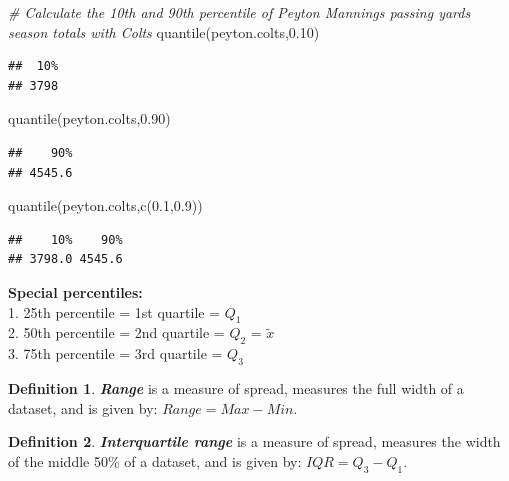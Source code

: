 \documentclass[
]{book}
\newenvironment{Shaded}{\begin{snugshade}}{\end{snugshade}}
\newcommand{\CommentTok}[1]{\textcolor[rgb]{0.56,0.35,0.01}{\textit{#1}}}
\newcommand{\FloatTok}[1]{\textcolor[rgb]{0.00,0.00,0.81}{#1}}
\newcommand{\FunctionTok}[1]{\textcolor[rgb]{0.00,0.00,0.00}{#1}}
\newcommand{\NormalTok}[1]{#1}
\theoremstyle{definition}
\newtheorem{definition}{Definition}[chapter]
\theoremstyle{definition}
\theoremstyle{definition}
\theoremstyle{definition}
\theoremstyle{remark}
\begin{document}
\begin{Shaded}
\begin{Highlighting}[]
\CommentTok{\# Calculate the 10th and 90th percentile of Peyton Manning\textquotesingle{}s passing yards season totals with Colts}
\FunctionTok{quantile}\NormalTok{(peyton.colts,}\FloatTok{0.10}\NormalTok{)}
\end{Highlighting}
\end{Shaded}

\begin{verbatim}
##  10% 
## 3798
\end{verbatim}

\begin{Shaded}
\begin{Highlighting}[]
\FunctionTok{quantile}\NormalTok{(peyton.colts,}\FloatTok{0.90}\NormalTok{)}
\end{Highlighting}
\end{Shaded}

\begin{verbatim}
##    90% 
## 4545.6
\end{verbatim}

\begin{Shaded}
\begin{Highlighting}[]
\FunctionTok{quantile}\NormalTok{(peyton.colts,}\FunctionTok{c}\NormalTok{(}\FloatTok{0.1}\NormalTok{,}\FloatTok{0.9}\NormalTok{))}
\end{Highlighting}
\end{Shaded}

\begin{verbatim}
##    10%    90% 
## 3798.0 4545.6
\end{verbatim}

\textbf{Special percentiles:}\\
1. 25th percentile = 1st quartile = \(Q_1\)\\
2. 50th percentile = 2nd quartile = \(Q_2\) = \(\tilde{x}\)\\
3. 75th percentile = 3rd quartile = \(Q_3\)\\

\begin{definition}
\textbf{\emph{Range}} is a measure of spread, measures the full width of a dataset, and is given by: \(Range = Max - Min\).
\end{definition}

\begin{definition}
\textbf{\emph{Interquartile range}} is a measure of spread, measures the width of the middle 50\% of a dataset, and is given by: \(IQR = Q_3 - Q_1\).
\end{definition}
\end{document}
